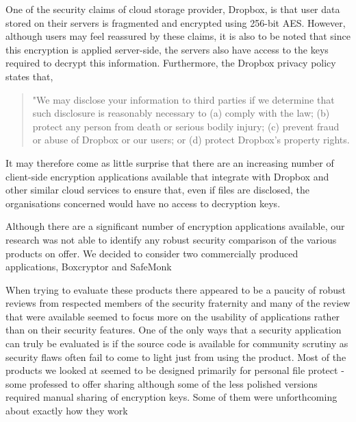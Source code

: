 One of the security claims of cloud storage provider, Dropbox, is that user data stored on their servers is  fragmented and encrypted using 256-bit AES.  However, although users may feel reassured by these claims, it is also to be noted that since this encryption is applied server-side, the servers also have access to the keys required to decrypt this information.  Furthermore, the   Dropbox privacy policy states that,  
\begin{quotation}
"We may disclose your information to third parties if we determine that such disclosure is reasonably necessary to (a) comply with the law; (b) protect any person from death or serious bodily injury; (c) prevent fraud or abuse of Dropbox or our users; or (d) protect Dropbox's property rights. 
\end{quotation} 

It may therefore come as little surprise that there are an increasing  number of client-side encryption applications available that  integrate with Dropbox and other similar cloud services  to ensure that, even if files are disclosed, the organisations concerned would have no access to decryption keys.

Although there are a significant number of encryption applications available, our research was not able to identify any robust security comparison of the various products on offer.  We decided to consider two commercially produced applications, Boxcryptor and SafeMonk 

When trying to evaluate these products there appeared to be a paucity of robust reviews from respected members of the security fraternity and many of the review that were available seemed to focus more on the usability of applications rather than on their security features.  One of the only ways that a security application can truly be evaluated is if the source code is available for community scrutiny as security flaws often fail to come to light just from using the product.  Most of the products we looked at seemed to be designed primarily for personal file protect - some professed to offer sharing although some of the less polished versions required manual sharing of encryption keys.  Some of them were unforthcoming about exactly how they work

